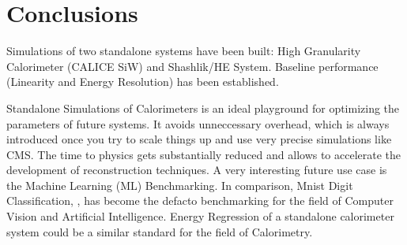 \section{Conclusions} \label{section:simulations_conclusions}
Simulations of two standalone systems have been built: High Granularity Calorimeter (CALICE SiW) and Shashlik/HE System. Baseline performance (Linearity and Energy Resolution) has been established. %

Standalone Simulations of Calorimeters is an ideal playground for optimizing the parameters of future systems. It avoids unneccessary overhead, which is always introduced once you try to scale things up and use very precise simulations like CMS. The time to physics gets substantially reduced and allows to accelerate the development of reconstruction techniques. A very interesting future use case is the Machine Learning (ML) Benchmarking. In comparison, Mnist Digit Classification, \cite{mnist}, has become the defacto benchmarking for the field of Computer Vision and Artificial Intelligence. Energy Regression of a standalone calorimeter system could be a similar standard for the field of Calorimetry.